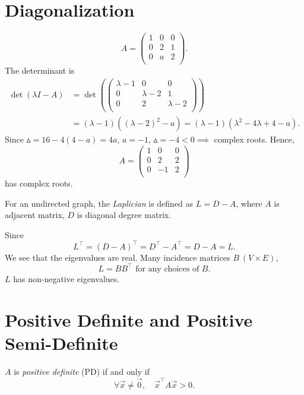 \section{Diagonalization}
\begin{eg}
	\[
		A = \begin{pmatrix}
			1 & 0 & 0 \\
			0 & 2 & 1 \\
			0 & a & 2 \\
		\end{pmatrix}.
	\]
	The determinant is
	\[
		\begin{split}
			\det(\lambda I - A) &= \det \left(  \begin{pmatrix}
				\lambda - 1 & 0            & 0             \\
				0           & \lambda -  2 & 1             \\
				0           & 2            & \lambda -   2 \\
			\end{pmatrix}\right)\\
			&= (\lambda - 1)((\lambda - 2 )^2 - a) = (\lambda - 1)(\lambda^2 - 4\lambda + 4 - a).
		\end{split}
	\]
	Since \(\vartriangle = 16 - 4(4-a) = 4a\),  \(a = -1\), \(\vartriangle = -4 < 0 \implies\) complex roots. Hence,
	\[
		A = \begin{pmatrix}
			1 & 0  & 0 \\
			0 & 2  & 2 \\
			0 & -1 & 2 \\
		\end{pmatrix}
	\] has complex roots.
\end{eg}

\begin{definition}[Laplician]
	For an undirected graph, the \emph{Laplician} is defined as \(L = D - A\), where \(A\) is adjacent matrix, \(D\) is diagonal degree matrix.
\end{definition}
\begin{remark}
	Since \[
		L^{\top} = (D - A)^{\top} = D^{\top} - A^{\top} = D - A = L.
	\] We see that the eigenvalues are real. Many incidence matrices \(B\ (V\times  E)\),
	\[
		L = BB^{\top} \text{ for any choices of }B.
	\]
	\(L\) has non-negative eigenvalues.
\end{remark}

\section{Positive Definite and Positive Semi-Definite}
\begin{definition}
	\(A \) is \emph{positive definite} (PD) if and only if
	\[
		\forall \vec{x} \neq  \vec{0},\quad \vec{x}^{\top}A \vec{x} > 0.
	\]
\end{definition}

